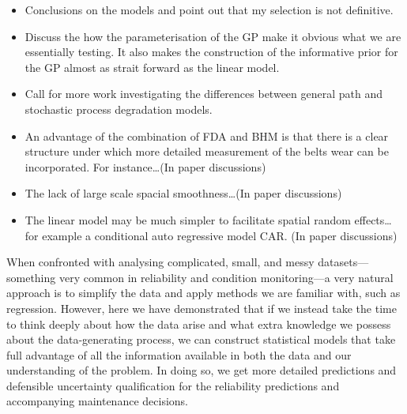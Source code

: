 \begin{itemize}
  \item Conclusions on the models and point out that my selection is not definitive.
  \item Discuss the how the parameterisation of the GP make it obvious what we are essentially testing. It also makes the construction of the informative prior for the GP almost as strait forward as the linear model.
  \item Call for more work investigating the differences between general path and stochastic process degradation models.
  \item An advantage of the combination of FDA and BHM is that there is a clear structure under which more detailed measurement of the belts wear can be incorporated. For instance\ldots (In paper discussions)
  \item The lack of large scale spacial smoothness\ldots (In paper discussions)
  \item The linear model may be much simpler to facilitate spatial random effects\ldots for example a conditional auto regressive model CAR. (In paper discussions)
\end{itemize}

When confronted with analysing complicated, small, and messy datasets---something very common in reliability and condition monitoring---a very natural approach is to simplify the data and apply methods we are familiar with, such as regression. However, here we have demonstrated that if we instead take the time to think deeply about how the data arise and what extra knowledge we possess about the data-generating process, we can construct statistical models that take full advantage of all the information available in both the data and our understanding of the problem. In doing so, we get more detailed predictions and defensible uncertainty qualification for the reliability predictions and accompanying maintenance decisions.